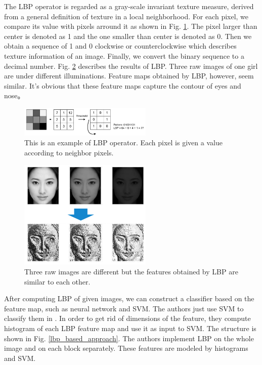 \documentclass[journal]{IEEEtran}
\begin{document}
The LBP operator \cite{ojala2002multiresolution} is regarded as a gray-scale invariant texture measure, derived from a general definition of texture in a local neighborhood. For each pixel, we compare its value with pixels arround it as shown in Fig. \ref{LBP}. The pixel larger than center is denoted as 1 and the one smaller than center is denoted as 0. Then we obtain a sequence of 1 and 0 clockwise or counterclockwise which describes texture information of an image. Finally, we convert the binary sequence to a decimal number. Fig. \ref{results_of_LBP} describes the results of LBP. Three raw images of one girl are under different illuminations. Feature maps obtained by LBP, however, seem similar. It's obvious that these feature maps capture the contour of eyes and nose。

\begin{figure}[!t]
\centering
\includegraphics[width=2.5in]{img/2-A-(3).png}
\caption{This is an example of LBP operator. Each pixel is given a value according to neighbor pixels. \cite{maatta2011face}}
\label{LBP}
\end{figure}

\begin{figure}[!t]
\centering
\includegraphics[width=2.5in]{img/2-A-(4).png}
\caption{Three raw images are different but the features obtained by LBP are similar to each other.}
\label{results_of_LBP}
\end{figure}

After computing LBP of given images, we can construct a classifier based on the feature map, such as neural network and SVM. The authors just use SVM to classify them in \cite{chingovska2012effectiveness}\cite{maatta2011face}. In order to get rid of dimensions of the feature, they compute histogram of each LBP feature map and use it as input to SVM. The structure is shown in Fig. \ref{lbp_based_approach}. The authors implement LBP on the whole image and on each block separately. These features are modeled by histograms and SVM.
\end{document}
